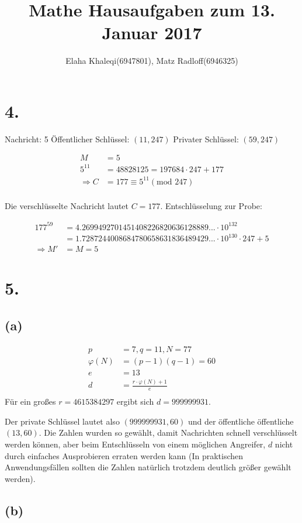 \documentclass[11pt,a4paper]{article}
\title{\textbf{Mathe Hausaufgaben zum 13. Januar 2017}}
\author{Elaha Khaleqi(6947801), Matz Radloff(6946325)}
\begin{document}
  \maketitle
  \date{}

\section*{4.}
Nachricht: 5
Öffentlicher Schlüssel: $(11, 247)$
Privater Schlüssel: $(59, 247)$

\begin{align*}
M &= 5\\
5^{11} &= 48828125 = 197684 \cdot 247 + 177\\
\Rightarrow C &= 177 \equiv 5^{11} (\mbox{mod } 247)\\
\end{align*}

Die verschlüsselte Nachricht lautet $C = 177$.
Entschlüsselung zur Probe:

\begin{align*}
177^{59} &= 4.2699492701451408226820636128889... \cdot 10^{132}\\
&= 1.7287244008684780658631836489429... \cdot 10^{130} \cdot 247 + 5\\
\Rightarrow M' &= M = 5
\end{align*}

\section*{5.}

\subsection*{(a)}

\begin{align*}
p &= 7, q = 11, N = 77\\
\varphi(N) &= (p - 1)(q - 1) = 60\\
e &= 13\\
d &= \frac{r \cdot \varphi(N) + 1}{e}\\
\end{align*}
Für ein großes $r = 4615384297$ ergibt sich $d = 999999931$.

Der private Schlüssel lautet also $(999999931, 60)$ und der öffentliche öffentliche $(13, 60)$.
Die Zahlen wurden so gewählt, damit Nachrichten schnell verschlüsselt werden können, aber beim Entschlüsseln von einem möglichen Angreifer, $d$ nicht durch einfaches Ausprobieren erraten werden kann (In praktischen Anwendungsfällen sollten die Zahlen natürlich trotzdem deutlich größer gewählt werden).

\subsection*{(b)}
\end{document}
